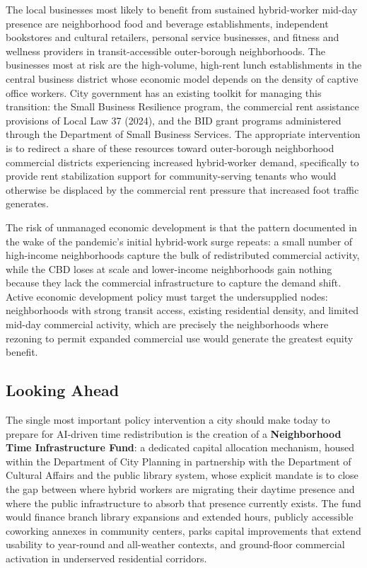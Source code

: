 \documentclass[10pt, twocolumn]{article}
\begin{document}
The local businesses most likely to benefit from sustained hybrid-worker mid-day presence are neighborhood food and beverage establishments, independent bookstores and cultural retailers, personal service businesses, and fitness and wellness providers in transit-accessible outer-borough neighborhoods. The businesses most at risk are the high-volume, high-rent lunch establishments in the central business district whose economic model depends on the density of captive office workers. City government has an existing toolkit for managing this transition: the Small Business Resilience program, the commercial rent assistance provisions of Local Law 37 (2024), and the BID grant programs administered through the Department of Small Business Services. The appropriate intervention is to redirect a share of these resources toward outer-borough neighborhood commercial districts experiencing increased hybrid-worker demand, specifically to provide rent stabilization support for community-serving tenants who would otherwise be displaced by the commercial rent pressure that increased foot traffic generates.

The risk of unmanaged economic development is that the pattern documented in the wake of the pandemic's initial hybrid-work surge repeats: a small number of high-income neighborhoods capture the bulk of redistributed commercial activity, while the CBD loses at scale and lower-income neighborhoods gain nothing because they lack the commercial infrastructure to capture the demand shift. Active economic development policy must target the undersupplied nodes: neighborhoods with strong transit access, existing residential density, and limited mid-day commercial activity, which are precisely the neighborhoods where rezoning to permit expanded commercial use would generate the greatest equity benefit.

\subsection*{Looking Ahead}

The single most important policy intervention a city should make today to prepare for AI-driven time redistribution is the creation of a \textbf{Neighborhood Time Infrastructure Fund}: a dedicated capital allocation mechanism, housed within the Department of City Planning in partnership with the Department of Cultural Affairs and the public library system, whose explicit mandate is to close the gap between where hybrid workers are migrating their daytime presence and where the public infrastructure to absorb that presence currently exists. The fund would finance branch library expansions and extended hours, publicly accessible coworking annexes in community centers, parks capital improvements that extend usability to year-round and all-weather contexts, and ground-floor commercial activation in underserved residential corridors.
\end{document}
